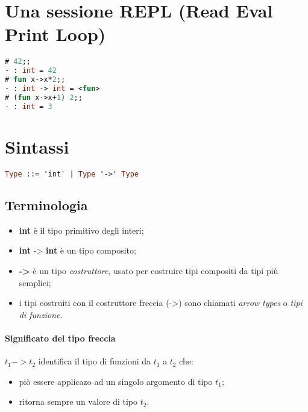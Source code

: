 \section{Una sessione REPL (Read Eval Print Loop)}
\begin{lstlisting}[language=Caml, caption={I tipi possono essere inferiti dall'interprete}]
# 42;;
- : int = 42
# fun x->x*2;;
- : int -> int = <fun>
# (fun x->x+1) 2;;
- : int = 3
\end{lstlisting}

\section{Sintassi}
\begin{lstlisting}[language=Caml, caption={Grammatica BNF}]
Type ::= 'int' | Type '->' Type
\end{lstlisting}

\subsection{Terminologia}
\begin{itemize}
  \item \textbf{int} è il tipo primitivo degli interi;
  \item \textbf{int} -> \textbf{int} è un tipo composito;
  \item \textbf{->} è un tipo \textit{costruttore}, usato per costruire tipi
    compositi da tipi più semplici;
  \item i tipi costruiti con il costruttore freccia (->) sono chiamati \emph{
    arrow types} o \emph{tipi di funzione}.
\end{itemize}

\paragraph{Significato del tipo freccia}
$t_1 -> t_2$ identifica il tipo di funzioni da $t_1$ a $t_2$ che:
\begin{itemize}
  \item piò essere applicazo ad un singolo argomento di tipo $t_1$;
  \item ritorna sempre un valore di tipo $t_2$.
\end{itemize}

